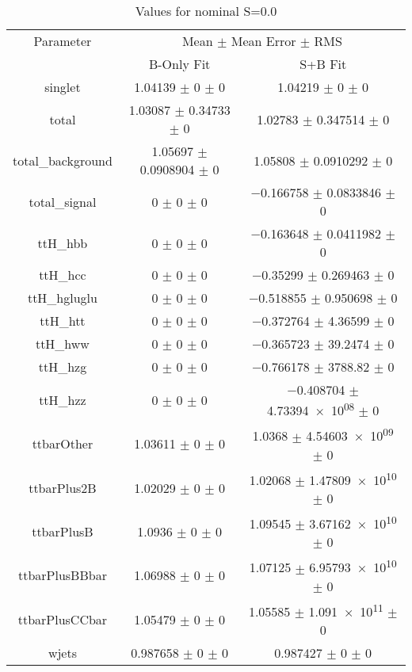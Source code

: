 \begin{table}
\centering
\caption{Values for nominal S=0.0}
\begin{tabular}{ccc}
\toprule
Parameter & \multicolumn{2}{c}{Mean $\pm$ Mean Error $\pm$ RMS}\\
 & B-Only Fit & S+B Fit\\
\midrule
singlet & \num{1.04139} $\pm$ \num{0} $\pm$ \num{0} & \num{1.04219} $\pm$ \num{0} $\pm$ \num{0}\\
total & \num{1.03087} $\pm$ \num{0.34733} $\pm$ \num{0} & \num{1.02783} $\pm$ \num{0.347514} $\pm$ \num{0}\\
total\_background & \num{1.05697} $\pm$ \num{0.0908904} $\pm$ \num{0} & \num{1.05808} $\pm$ \num{0.0910292} $\pm$ \num{0}\\
total\_signal & \num{0} $\pm$ \num{0} $\pm$ \num{0} & \num{-0.166758} $\pm$ \num{0.0833846} $\pm$ \num{0}\\
ttH\_hbb & \num{0} $\pm$ \num{0} $\pm$ \num{0} & \num{-0.163648} $\pm$ \num{0.0411982} $\pm$ \num{0}\\
ttH\_hcc & \num{0} $\pm$ \num{0} $\pm$ \num{0} & \num{-0.35299} $\pm$ \num{0.269463} $\pm$ \num{0}\\
ttH\_hgluglu & \num{0} $\pm$ \num{0} $\pm$ \num{0} & \num{-0.518855} $\pm$ \num{0.950698} $\pm$ \num{0}\\
ttH\_htt & \num{0} $\pm$ \num{0} $\pm$ \num{0} & \num{-0.372764} $\pm$ \num{4.36599} $\pm$ \num{0}\\
ttH\_hww & \num{0} $\pm$ \num{0} $\pm$ \num{0} & \num{-0.365723} $\pm$ \num{39.2474} $\pm$ \num{0}\\
ttH\_hzg & \num{0} $\pm$ \num{0} $\pm$ \num{0} & \num{-0.766178} $\pm$ \num{3788.82} $\pm$ \num{0}\\
ttH\_hzz & \num{0} $\pm$ \num{0} $\pm$ \num{0} & \num{-0.408704} $\pm$ \num{4.73394e+08} $\pm$ \num{0}\\
ttbarOther & \num{1.03611} $\pm$ \num{0} $\pm$ \num{0} & \num{1.0368} $\pm$ \num{4.54603e+09} $\pm$ \num{0}\\
ttbarPlus2B & \num{1.02029} $\pm$ \num{0} $\pm$ \num{0} & \num{1.02068} $\pm$ \num{1.47809e+10} $\pm$ \num{0}\\
ttbarPlusB & \num{1.0936} $\pm$ \num{0} $\pm$ \num{0} & \num{1.09545} $\pm$ \num{3.67162e+10} $\pm$ \num{0}\\
ttbarPlusBBbar & \num{1.06988} $\pm$ \num{0} $\pm$ \num{0} & \num{1.07125} $\pm$ \num{6.95793e+10} $\pm$ \num{0}\\
ttbarPlusCCbar & \num{1.05479} $\pm$ \num{0} $\pm$ \num{0} & \num{1.05585} $\pm$ \num{1.091e+11} $\pm$ \num{0}\\
wjets & \num{0.987658} $\pm$ \num{0} $\pm$ \num{0} & \num{0.987427} $\pm$ \num{0} $\pm$ \num{0}\\
\bottomrule
\end{tabular}
\end{table}